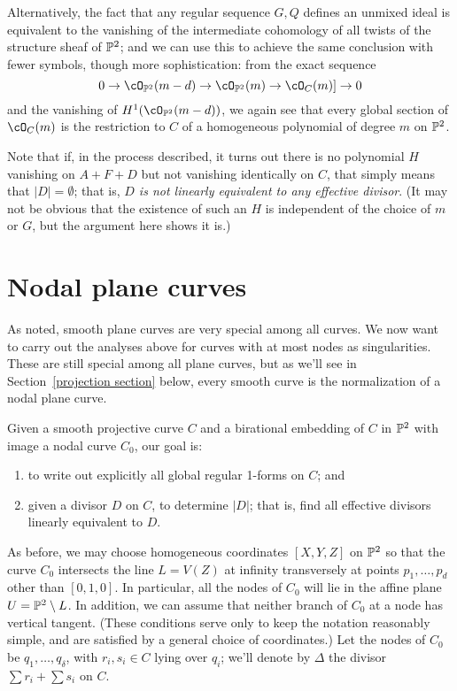 Alternatively, the fact that any regular sequence $G,Q$ defines an unmixed ideal is equivalent to the vanishing of the intermediate cohomology of all twists of the structure sheaf of $\PP^2$; and we can use this to achieve the same conclusion with fewer symbols, though more sophistication: from the exact sequence 
$$
0 \to \cO_{\PP^2}(m-d) \to \cO_{\PP^2}(m)  \to \cO_C(m) ]\to 0
$$
and the vanishing of $H^1(\cO_{\PP^2}(m-d))$, we again see that every global section of $ \cO_C(m)$ is the restriction to $C$ of a homogeneous polynomial of degree $m$ on $\PP^2$. 

Note that if, in the process described, it turns out there is no polynomial $H$ vanishing on  $A + F + D$ but not vanishing identically on $C$, that simply means that $|D| = \emptyset$; that is, \emph{$D$ is not linearly equivalent to any effective divisor}. (It may not be obvious that the existence of such an $H$ is independent of the choice of $m$ or $G$, but the argument here shows it is.)

\section{Nodal plane curves}\label{nodal plane curves}

As noted, smooth plane curves are very special among all curves. We now want to carry out the analyses above for curves with at most nodes as singularities. These are still special among all plane curves, but as we'll see in Section~\ref{projection section} below, every smooth curve is the normalization of a nodal plane curve.

Given a smooth projective curve $C$ and a birational embedding of $C$ in $\PP^2$ with image a nodal curve $C_0$, our goal is:
\begin{enumerate}
\item to write out explicitly all global regular 1-forms on $C$; and
\item given a divisor $D$ on $C$, to  determine $|D|$; that is, find all effective divisors linearly equivalent to $D$.
\end{enumerate}

As before, we may choose homogeneous coordinates  $[X,Y,Z]$ on $\PP^2$ so that the curve $C_0$ intersects the line $L = V(Z)$ at infinity transversely at points $p_1,\dots,p_d$ other than $[0,1,0]$. In particular,  all the nodes of $C_0$ will lie in the affine plane $U = \PP^2 \setminus L$.
In addition, we can assume that  neither branch of $C_0$ at a node has vertical tangent. (These conditions serve only to keep the notation reasonably simple, and are satisfied by a general choice of coordinates.) Let the nodes of $C_0$ be $q_1,\dots,q_\delta$, with $r_i, s_i \in C$ lying over $q_i$; we'll denote by $\Delta$ the divisor $\sum r_i + \sum s_i$ on $C$.

